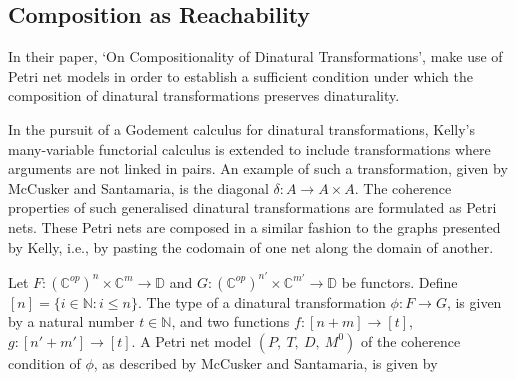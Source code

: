 \documentclass[../../Dissertation.tex]{subfiles}
\begin{document}
\subsection{Composition as Reachability}\label{sec:compasreach}
In their paper, `On Compositionality of Dinatural Transformations',  make use of Petri net models in order to establish a sufficient condition under which the composition of dinatural transformations preserves dinaturality. 
\par
In the pursuit of a Godement calculus for dinatural transformations, Kelly's many-variable functorial calculus is extended to include transformations where arguments are not linked in pairs. An example of such a transformation, given by McCusker and Santamaria, is the diagonal $\delta : A \rightarrow A \times A$. The coherence properties of such generalised dinatural transformations are formulated as Petri nets. These Petri nets are composed in a similar fashion to the graphs presented by Kelly, i.e., by pasting the codomain of one net along the domain of another. 
\par
Let $F : (\mathbb{C}^{op})^n \times \mathbb{C}^m \rightarrow \mathbb{D}$ and $G : (\mathbb{C}^{op})^{n'} \times \mathbb{C}^{m'} \rightarrow \mathbb{D}$ be functors. Define $[n] = \{i \in \mathbb{N} : i \leq n\}$. The type of a dinatural transformation $\phi : F \rightarrow G$, is given by a natural number $t \in \mathbb{N}$, and two functions $f : [n + m] \rightarrow [t]$, $g : [n' + m'] \rightarrow [t]$. A Petri net model $(P,\ T,\ D,\ M^0)$ of the coherence condition of $\phi$, as described by McCusker and Santamaria, is given by
\end{document}
